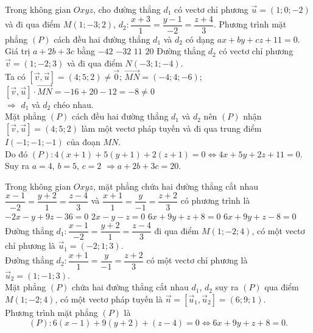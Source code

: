 \begin{ex}%
Trong không gian $Oxyz$, cho đường thẳng $d_1$ có vectơ chỉ phương $\overrightarrow{u}=(1;0;-2)$ và đi qua điểm $M(1;-3;2)$, $d_2\colon\dfrac{x+3}{1}=\dfrac{y-1}{-2}=\dfrac{z+4}{3}$. Phương trình mặt phẳng $(P)$ cách đều hai đường thẳng $d_1$ và $d_2$ có dạng $ax+by+cz+11=0$. Giá trị $ a+2b+3c$ bằng
\choice
{$-42$}
{$-32$}
{$ 11$}
{\True $20$}
\loigiai
{
Đường thẳng $d_2$ có vectơ chỉ phương $\overrightarrow{v}=(1;-2;3)$ và đi qua điểm $ N(-3;1;-4)$.\\
Ta có $\left[\overrightarrow{v},\overrightarrow{u}\right]=(4;5;2)\ne\overrightarrow{0}$; $\overrightarrow{MN}=\left(-4;4;-6\right)$; $\left[\overrightarrow{v},\overrightarrow{u}\right]\cdot \overrightarrow{MN}=-16+20-12=-8\ne 0$\\
$\Rightarrow $ $d_1$ và $d_2$ chéo nhau.\\
Mặt phẳng $(P)$ cách đều hai đường thẳng $d_1$ và $d_2$ nên $(P)$ nhận $\left[\overrightarrow{v},\overrightarrow{u}\right]=(4;5;2)$ làm một vectơ pháp tuyến và đi qua trung điểm $ I(-1;-1;-1)$ của đoạn $ MN$.\\
Do đó $(P)\colon 4\left(x+1\right)+5\left(y+1\right)+2\left(z+1\right)=0\Leftrightarrow 4x+5y+2z+11=0$.\\
Suy ra $ a=4$, $b=5$, $c=2$ $\Rightarrow a+2b+3c=20$.}
\end{ex}

\begin{ex}%
Trong không gian $ Oxyz$, mặt phẳng chứa hai đường thẳng cắt nhau $\dfrac{x-1}{-2}=\dfrac{y+2}{1}=\dfrac{z-4}{3}$ và $\dfrac{x+1}{1}=\dfrac{y}{-1}=\dfrac{z+2}{3}$ có phương trình là
\choice
{$-2x-y+9z-36=0$}
{$ 2x-y-z=0$}
{\True $ 6x+9y+z+8=0$}
{$ 6x+9y+z-8=0$}
\loigiai
{
Đường thẳng $d_1\colon\dfrac{x-1}{-2}=\dfrac{y+2}{1}=\dfrac{z-4}{3}$ đi qua điểm $ M(1;-2;4)$, có một vectơ chỉ phương là $\overrightarrow{u}_1=(-2;1;3)$.\\
Đường thẳng $d_2\colon\dfrac{x+1}{1}=\dfrac{y}{-1}=\dfrac{z+2}{3}$ có một vectơ chỉ phương là $\overrightarrow{u}_2=(1;-1;3)$.\\
Mặt phẳng $(P)$ chứa hai đường thẳng cắt nhau $d_1$, $d_2$ suy ra $(P)$ qua điểm $ M(1;-2;4)$, có một vectơ pháp tuyến là $\overrightarrow{n}=\left[\overrightarrow{u}_1,\overrightarrow{u}_2\right]=(6;9;1)$.\\ Phương trình mặt phẳng $(P)$ là 
$$(P)\colon 6(x-1)+9(y+2)+(z-4)=0\Leftrightarrow 6x+9y+z+8=0.$$}
\end{ex}

